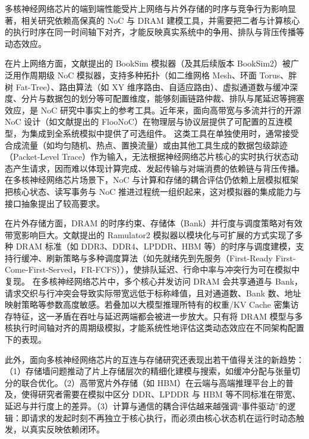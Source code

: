 
多核神经网络芯片的端到端性能受片上网络与片外存储的时序与竞争行为影响显著，相关研究依赖高保真的 NoC 与 DRAM 建模工具，并需要把二者与计算核心的执行时序在同一时间轴下对齐，才能反映真实系统中的争用、排队与背压传播等动态效应。

在片上网络方面，文献\parencite{jiang2013booksim}提出的 BookSim 模拟器（及其后续版本 BookSim2）被广泛用作周期级 NoC 模拟器，支持多种拓扑（如二维网格 Mesh、环面 Torus、胖树 Fat-Tree）、路由算法（如 XY 维序路由、自适应路由）、虚拟通道数与缓冲深度、分片与数据包的划分等可配置维度，能够刻画链路仲裁、排队与尾延迟等拥塞效应，是 NoC 研究中事实上的参考工具。近年来，面向高带宽与多流并行的开源 NoC 设计（如文献\parencite{flooonoc2024}提出的 FlooNoC）在物理层与协议层提供了可配置的互连模型，为集成到全系统模拟中提供了可选组件。 这类工具在单独使用时，通常接受合成流量（如均匀随机、热点、置换流量）或由其他工具生成的数据包级踪迹（Packet-Level Trace）作为输入，无法根据神经网络芯片核心的实时执行状态动态产生请求，因而难以体现计算完成、发起传输与对端消费的依赖链与背压传播。在多核神经网络芯片场景下，NoC 与计算和存储的耦合评估仍依赖上层模拟框架把核心状态、读写事务与 NoC 推进过程统一组织起来，这对模拟器的集成能力与接口抽象提出了较高要求。

在片外存储方面，DRAM 的时序约束、存储体（Bank）并行度与调度策略对有效带宽影响巨大。文献\parencite{luo2023ramulator2}提出的 Ramulator2 模拟器以模块化与可扩展的方式实现了多种 DRAM 标准（如 DDR3、DDR4、LPDDR、HBM 等）的时序与调度建模，支持行缓冲、刷新策略与多种调度算法（如先就绪先到先服务（First-Ready First-Come-First-Served，FR-FCFS）），使排队延迟、行命中率与冲突行为可在模拟中复现。 在多核神经网络芯片中，多个核心并发访问 DRAM 会共享通道与 Bank，请求交织与行冲突会导致实际带宽远低于标称峰值，且对通道数、Bank 数、地址映射策略等参数高度敏感。若叠加以大模型推理所特有的权重/KV Cache 密集访存特征，这一矛盾在吞吐与延迟两端都会被进一步放大\cite{gholami2024aimemorywall}。只有将 DRAM 模型与多核执行时间轴对齐的周期级模拟，才能系统性地评估这类动态效应在不同架构配置下的表现。

此外，面向多核神经网络芯片的互连与存储研究还表现出若干值得关注的新趋势：（1）存储墙问题推动了片上存储层次的精细化建模与搜索，如缓冲分配与张量切分的联合优化\cite{bufferprospector2024,set2023isca}。（2）高带宽片外存储（如 HBM）在云端与高端推理平台上的普及，使得研究者需要在模拟中区分 DDR、LPDDR 与 HBM 等不同标准在带宽、延迟与并行度上的差异。（3）计算与通信的耦合评估越来越强调“事件驱动”的逻辑：即请求的发起时刻不再独立于核心执行，而必须由核心状态机在运行时动态触发，以真实反映依赖闭环。

